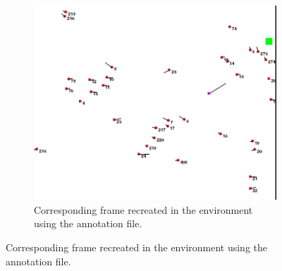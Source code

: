 \begin{enumerate}
\begin{figure}[htbp]
\begin{subfigure}{0.5\textwidth}
		\includegraphics[width=0.95\linewidth]{figures/env_screenshot.jpg}
		\caption{Corresponding frame recreated in the environment using the annotation file.}
		\label{fig:anno_sfig2}
	\end{subfigure}
\end{figure}
\end{enumerate}
